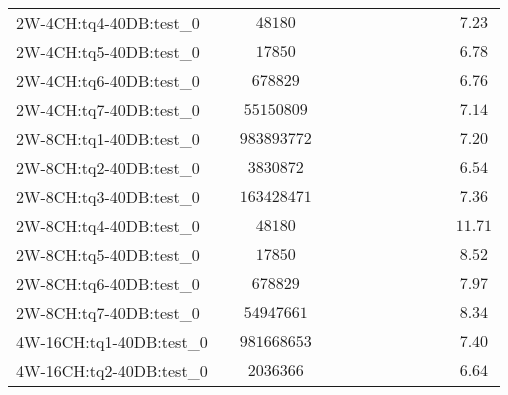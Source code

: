 \begin{tabular}{|l|c|c|c|c|c|c|c|c|c|c|c|}
2W-4CH:tq4-40DB:test\_0   & $          $ & $ 48180       $ & $       $ & $  $ & $    $ & $       $ & $  $ & $   $ & $             $ & $         $ & $ 7.23    $ \\
2W-4CH:tq5-40DB:test\_0   & $          $ & $ 17850       $ & $       $ & $  $ & $    $ & $       $ & $  $ & $   $ & $             $ & $         $ & $ 6.78    $ \\
2W-4CH:tq6-40DB:test\_0   & $          $ & $ 678829      $ & $       $ & $  $ & $    $ & $       $ & $  $ & $   $ & $             $ & $         $ & $ 6.76    $ \\
2W-4CH:tq7-40DB:test\_0   & $          $ & $ 55150809    $ & $       $ & $  $ & $    $ & $       $ & $  $ & $   $ & $             $ & $         $ & $ 7.14    $ \\
2W-8CH:tq1-40DB:test\_0   & $          $ & $ 983893772   $ & $       $ & $  $ & $    $ & $       $ & $  $ & $   $ & $             $ & $         $ & $ 7.20    $ \\
2W-8CH:tq2-40DB:test\_0   & $          $ & $ 3830872     $ & $       $ & $  $ & $    $ & $       $ & $  $ & $   $ & $             $ & $         $ & $ 6.54    $ \\
2W-8CH:tq3-40DB:test\_0   & $          $ & $ 163428471   $ & $       $ & $  $ & $    $ & $       $ & $  $ & $   $ & $             $ & $         $ & $ 7.36    $ \\
2W-8CH:tq4-40DB:test\_0   & $          $ & $ 48180       $ & $       $ & $  $ & $    $ & $       $ & $  $ & $   $ & $             $ & $         $ & $ 11.71   $ \\
2W-8CH:tq5-40DB:test\_0   & $          $ & $ 17850       $ & $       $ & $  $ & $    $ & $       $ & $  $ & $   $ & $             $ & $         $ & $ 8.52    $ \\
2W-8CH:tq6-40DB:test\_0   & $          $ & $ 678829      $ & $       $ & $  $ & $    $ & $       $ & $  $ & $   $ & $             $ & $         $ & $ 7.97    $ \\
2W-8CH:tq7-40DB:test\_0   & $          $ & $ 54947661    $ & $       $ & $  $ & $    $ & $       $ & $  $ & $   $ & $             $ & $         $ & $ 8.34    $ \\
4W-16CH:tq1-40DB:test\_0  & $          $ & $ 981668653   $ & $       $ & $  $ & $    $ & $       $ & $  $ & $   $ & $             $ & $         $ & $ 7.40    $ \\
4W-16CH:tq2-40DB:test\_0  & $          $ & $ 2036366     $ & $       $ & $  $ & $    $ & $       $ & $  $ & $   $ & $             $ & $         $ & $ 6.64    $ \\

\end{tabular}

